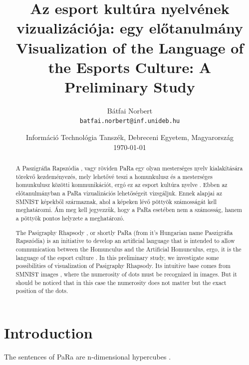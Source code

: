 \documentclass[a4paper]{article}
\begin{document}
\title{Az esport kultúra nyelvének vizualizációja: egy el\H otanulmány\\Visualization of the Language of the Esports Culture: A Preliminary Study}
\author{
	Bátfai Norbert\\
	\texttt{batfai.norbert@inf.unideb.hu}}
\date{
    Információ Technológia Tanszék, Debreceni Egyetem, Magyarország\\
    \today
}

\maketitle

\begin{abstract}
A Paszigráfia Rapszódia \cite{PARAREPO}, vagy röviden PaRa egy olyan mesterséges nyelv kialakítására törekv\H o kezdeményezés, mely lehetővé teszi a homunkulusz és a mesterséges homunkulusz közötti kommunikációt, ergó ez az esport kultúra nyelve \cite{MITEL}. Ebben az el\H otanulmányban a PaRa vizualizációs lehetőségeit vizsgáljuk. Ennek alapjai az SMNIST \cite{SMNIST} képekb\H ol származnak, ahol a képeken lév\H o pöttyök számosságát kell meghatározni. Ám meg kell jegyezzük, hogy a PaRa esetében nem a számosság, hanem a pöttyök pontos helyzete a meghatározó.
\end{abstract}

{
\begin{abstract}
The Pasigraphy Rhapsody \cite{PARAREPO}, or shortly PaRa (from it's Hungarian name Paszigr\'afia Rapsz\'odia) is an initiative to develop an artificial language that is intended to allow communication between the Homunculus and the Artificial Homunculus, ergo, it is the language of the esport culture \cite{MITEL}. In this preliminary study, we investigate some possibilities of visualization of Pasigraphy Rhapsody. Its intuitive base comes from SMNIST images \cite{SMNIST}, where the numerosity of dots must be recognized in images. But it should be noticed that in this case the numerosity does not matter but the exact position of the dots.
\end{abstract}
}


 
\section{Introduction}

The sentences of PaRa are n-dimensional hypercubes \cite{CONPARA}.
\end{document}
